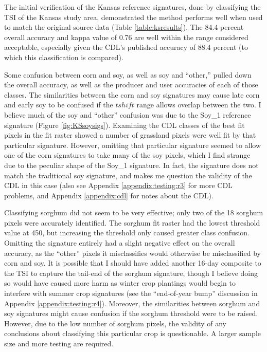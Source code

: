 The initial verification of the Kansas reference signatures, done by classifying the TSI of the Kansas study area, demonstrated the method performs well when used to match the original source data (Table \ref{table:ksresults}). The 84.4 percent overall accuracy and kappa value of 0.76 are well within the range considered acceptable, especially given the CDL's published accuracy of 88.4 percent (to which this classification is compared).

Some confusion between corn and soy, as well as soy and ``other,'' pulled down the overall accuracy, as well as the producer and user accuracies of each of those classes. The similarities between the corn and soy signatures may cause late corn and early soy to be confused if the $tshift$ range allows overlap between the two. I believe much of the soy and ``other'' confusion was due to the Soy\_1 reference signature (Figure \ref{fig:KSsoysigs}). Examining the CDL classes of the best fit pixels in the fit raster showed a number of grassland pixels were well fit by that particular signature. However, omitting that particular signature seemed to allow one of the corn signatures to take many of the soy pixels, which I find strange due to the peculiar shape of the Soy\_1 signature. In fact, the signature does not match the traditional soy signature, and makes me question the validity of the CDL in this case (also see Appendix \ref{appendix:testing:r3} for more CDL problems, and Appendix \ref{appendix:cdl} for notes about the CDL).

Classifying sorghum did not seem to be very effective; only two of the 18 sorghum pixels were accurately identified. The sorghum fit raster had the lowest threshold value at 450, but increasing the threshold only caused greater class confusion. Omitting the signature entirely had a slight negative effect on the overall accuracy, as the ``other'' pixels it misclassifies would otherwise be misclassified by corn and soy. It is possible that I should have added another 16-day composite to the TSI to capture the tail-end of the sorghum signature, though I believe doing so would have caused more harm as winter crop plantings would begin to interfere with summer crop signatures (see the ``end-of-year bump'' discussion in Appendix \ref{appendix:testing:r4}). Moreover, the similarities between sorghum and soy signatures might cause confusion if the sorghum threshold were to be raised. However, due to the low number of sorghum pixels, the validity of any conclusions about classifying this particular crop is questionable. A larger sample size and more testing are required.

